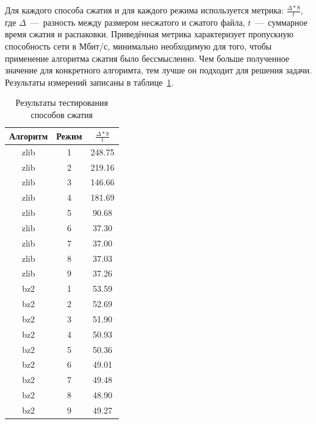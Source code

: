 \documentclass[12pt,a4paper,oneside]{extarticle}
\begin{document}
            Для каждого способа сжатия и для каждого режима используется метрика: $\frac{\Delta*8}{t}$, где $\Delta$~---~разность между размером несжатого и сжатого файла, $t$~---~суммарное время сжатия и распаковки. Приведённая метрика характеризует пропускную способность сети в Мбит/с, минимально необходимую для того, чтобы применение алгоритма сжатия было бессмысленно. Чем больше полученное значение для конкретного алгоримта, тем лучше он подходит для решения задачи. Результаты измерений записаны в таблице~\ref{table:compress}.

            \begin{table}[h!]
                \centering
                \begin{tabular}{|c|c|c|}
                    \hline
                    Алгоритм & Режим & $\frac{\Delta*8}{t}$ \\
                    \hline
                    zlib & 1 & 248.75 \\
                    zlib & 2 & 219.16 \\        
                    zlib & 3 & 146.66 \\
                    zlib & 4 & 181.69 \\
                    zlib & 5 & 90.68 \\
                    zlib & 6 & 37.30 \\
                    zlib & 7 & 37.00 \\
                    zlib & 8 & 37.03 \\
                    zlib & 9 & 37.26 \\
                    bz2 & 1 & 53.59 \\
                    bz2 & 2 & 52.69 \\
                    bz2 & 3 & 51.90 \\
                    bz2 & 4 & 50.93 \\
                    bz2 & 5 & 50.36 \\
                    bz2 & 6 & 49.01 \\
                    bz2 & 7 & 49.48 \\
                    bz2 & 8 & 48.90 \\
                    bz2 & 9 & 49.27 \\
                    \hline        
                \end{tabular}
           
                \caption{Результаты тестирования способов сжатия}
                \label{table:compress}
            \end{table}
\end{document}
